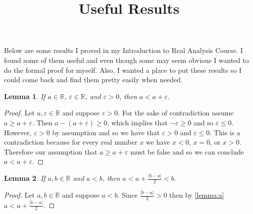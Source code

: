 \documentclass[12pt]{article}
\title{Useful Results}
\newtheorem{lemma}{Lemma}
\begin{document}
\maketitle

Below are some results I proved in my Introduction to Real Analysis Course. I found some of them useful and even though some may seem obvious I wanted to do the formal proof for myself. Also, I wanted a place to put these results so I could come back and find them pretty easily when needed.


\begin{lemma} \label{lemma:a}
If $a \in \mathbb{R}$, $\varepsilon \in \mathbb{R}$, and $\varepsilon > 0$, then $a < a + \varepsilon$.
\end{lemma}

\begin{proof}
Let $a, \varepsilon \in \mathbb{R}$ and suppose $\varepsilon > 0$. For the sake of contradiction assume $a \geq a + \varepsilon$. Then $a - (a + \varepsilon) \geq 0$, which implies that $-\varepsilon \geq 0$ and so $\varepsilon \leq 0$. However, $\varepsilon > 0$ by assumption and so we have that $\varepsilon > 0$ and $\varepsilon \leq 0$. This is a contradiction because for every real number $x$ we have $x < 0$, $x = 0$, or $x > 0$. Therefore our assumption that $a \geq a + \varepsilon$ must be false and so we can conclude $a < a + \varepsilon$. 
\end{proof}

\begin{lemma}
If $a, b \in \mathbb{R}$ and $a < b$, then $\displaystyle a < a + \frac{|b - a|}{2} < b$.
\end{lemma}

\begin{proof}
Let $a, b \in \mathbb{R}$ and suppose $a < b$. Since $\displaystyle \frac{|b - a|}{2} > 0$ then by \autoref{lemma:a} $\displaystyle a < a + \frac{|b - a|}{2}$. 
\end{proof}
\end{document}
